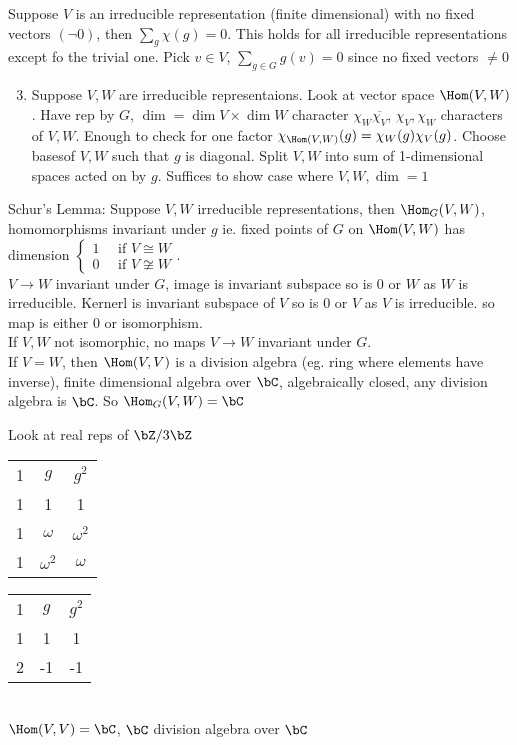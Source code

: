 \noindent
Suppose $V$ is an irreducible representation (finite dimensional) with no fixed vectors $(\neg 0)$, then $\sum_g \chi(g)=0$. This holds for all irreducible representations except fo the trivial one. Pick $v \in V$, $\sum_{g \in G}g(v)=0$ since no fixed vectors $\neq 0$ 

\begin{enumerate}
    \setcounter{enumi}{2}
    \item Suppose $V, W$ are irreducible representaions. Look at vector space $\Hom(V, W)$. Have rep by $G$, $\dim = \dim V \times \dim W$ character $\chi_W \overline{\chi_V}$, $\chi_V, \chi_W$ characters of $V,W$. Enough to check for one factor $\chi_{\Hom(V,W)}(g) = \chi_{W}(g) \chi_V(g)$. Choose basesof $V,W$ such that $g$ is diagonal. Split $V,W$ into sum of 1-dimensional spaces acted on by $g$. Suffices to show case where $V,W, \dim = 1$ 
\end{enumerate}

\noindent
Schur's Lemma: Suppose $V,W$ irreducible representations, then $\Hom_G(V,W)$, homomorphisms invariant under $g$ ie. fixed points of $G$ on $\Hom(V,W)$ has dimension $\begin{cases} 1 \quad \text{ if } V \cong W \\ 0 \quad \text{ if } V \not\cong W \end{cases}$. \\
$V \to W$ invariant under $G$, image is invariant subspace so is 0 or $W$ as $W$ is irreducible. Kernerl is invariant subspace of $V$ so is 0 or $V$ as $V$ is irreducible. so map is either 0 or isomorphism. \\
If $V,W$ not isomorphic, no maps $V \to W$ invariant under $G$. \\
If $V = W$, then $\Hom(V,V)$ is a division algebra (eg. ring where elements have inverse), finite dimensional algebra over $\bC$, algebraically closed, any division algebra is $\bC$. So $\Hom_G(V,W) = \bC$ 

\begin{example}
    Look at real reps of $\bZ/3\bZ$ \\
    \begin{tabular}{| c c c |} 1 & $g$ & $g^2$ \\ 1 & 1 & 1 \\ 1 & $\omega$ & $\omega^2$ \\ 1 & $\omega^2$ & $\omega$ \end{tabular} \quad \begin{tabular}{| c c c |} 1 & $g$ & $g^2$ \\ 1 & 1 & 1 \\ 2 & -1 & -1 \end{tabular} \\
    $\Hom(V,V) = \bC$, $\bC$ division algebra over $\bC$ 
\end{example}

